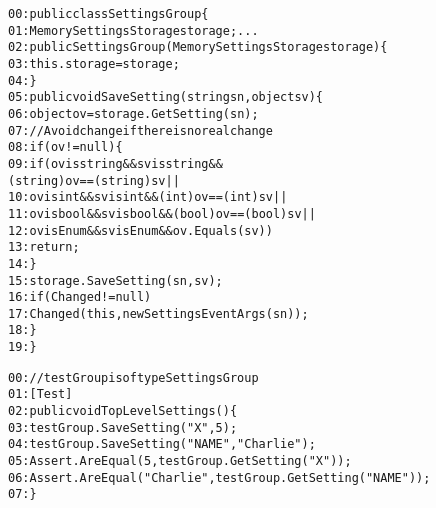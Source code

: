 \begin{figure}[t]
\begin{CodeOut}
\begin{alltt}
00:public class SettingsGroup \{
01:\hspace*{0.1in}MemorySettingsStorage storage; ...
02:\hspace*{0.1in}public SettingsGroup(MemorySettingsStorage storage) \{
03:\hspace*{0.2in}this.storage = storage;
04:\hspace*{0.1in}\}
05:\hspace*{0.1in}public void SaveSetting(string sn, object sv) \{
06:\hspace*{0.2in}object ov = storage.GetSetting( sn );
07:\hspace*{0.2in}//Avoid change if there is no real change
08:\hspace*{0.2in}if (ov != null ) \{
09:\hspace*{0.3in}if (ov is string && sv is string && 
\hspace*{1.0in}(string)ov == (string)sv ||
10:\hspace*{0.4in}ov is int && sv is int && (int)ov == (int)sv ||
11:\hspace*{0.4in}ov is bool && sv is bool && (bool)ov == (bool)sv ||
12:\hspace*{0.4in}ov is Enum && sv is Enum && ov.Equals(sv))
13:\hspace*{0.5in}return;
14:\hspace*{0.2in}\}
15:\hspace*{0.2in}storage.SaveSetting(sn, sv);
16:\hspace*{0.2in}if (Changed != null)
17:\hspace*{0.3in}Changed(this, new SettingsEventArgs(sn));
18:\hspace*{0.2in}\}
19:\}
\end{alltt}
\end{CodeOut}
\end{figure}

\begin{figure}[t]
\begin{CodeOut}
\begin{alltt}
00://testGroup is of type SettingsGroup
01:[Test]
02:public void TopLevelSettings() \{
03:\hspace*{0.1in}testGroup.SaveSetting("X", 5);
04:\hspace*{0.1in}testGroup.SaveSetting("NAME", "Charlie");
05:\hspace*{0.1in}Assert.AreEqual(5, testGroup.GetSetting("X"));
06:\hspace*{0.1in}Assert.AreEqual("Charlie", testGroup.GetSetting("NAME"));
07:\}
\end{alltt}
\end{CodeOut}
\end{figure}

